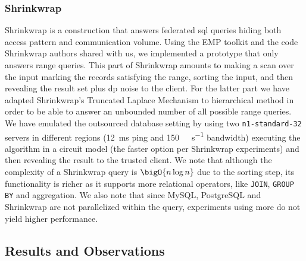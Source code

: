 		\subsubsection*{Shrinkwrap}

			Shrinkwrap \cite{shrinkwrap} is a construction that answers federated \acrshort{sql} queries hiding both access pattern and communication volume.
			Using the EMP toolkit \cite{emp-toolkit} and the code Shrinkwrap authors shared with us, we implemented a prototype that only answers range queries.
			This part of Shrinkwrap amounts to making a scan over the input marking the records satisfying the range, sorting the input, and then revealing the result set plus \acrshort{dp} noise to the client.
			For the latter part we have adapted Shrinkwrap's Truncated Laplace Mechanism \cite[Definition 4]{shrinkwrap} to hierarchical method \cite{hierarchical-methods-for-dp} in order to be able to answer an unbounded number of all possible range queries.
			We have emulated the outsourced database setting by using two \texttt{n1-standard-32} servers in different regions (\SI{12}{\milli\second} ping and \SI{150}{\mega\byte\per\second} bandwidth) executing the algorithm in a circuit model (the faster option per Shrinkwrap experiments) and then revealing the result to the trusted client.
			We note that although the complexity of a Shrinkwrap query is $\bigO{n \log n}$ due to the sorting step, its functionality is richer as it supports more relational operators, like \texttt{JOIN}, \texttt{GROUP BY} and aggregation.
			We also note that since MySQL, PostgreSQL and Shrinkwrap are not parallelized within the query, experiments using more  do not yield higher performance.

	\subsection{Results and Observations}\label{section:range-persistent:experiments:results}

